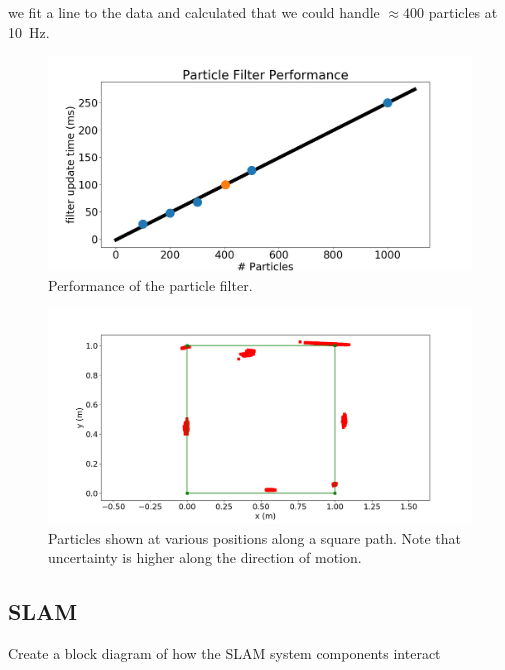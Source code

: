 \documentclass[journal]{IEEEtran}
\begin{document}
we fit a line to the data and calculated that we could handle $\approx400$ particles at \SI{10}{\hertz}.

\begin{figure}[b]
    \centering
    \includegraphics[width=1\linewidth]{filter_perf.png}
    \caption{Performance of the particle filter.}
    \label{fig:perf}
\end{figure}

\begin{figure}[b]
    \centering
    \includegraphics[width=1\linewidth]{drive_square_particles.png}
    \caption{Particles shown at various positions along a square path. Note that uncertainty is higher along the direction of motion.}
    \label{fig:square_particles}
\end{figure}

\subsection{SLAM}

Create a block diagram of how the SLAM system components interact
\end{document}
